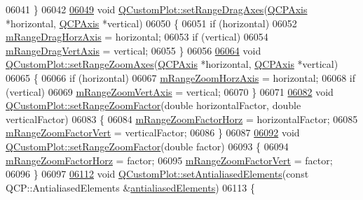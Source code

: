 \begin{DoxyCode}
06041 \}
06042 
\hypertarget{a00115_source_l06049}{}\hyperlink{a00116_a9fa10e826a174884391c1c839d52c0a3}{06049} \textcolor{keywordtype}{void} \hyperlink{a00116_a9fa10e826a174884391c1c839d52c0a3}{QCustomPlot::setRangeDragAxes}(\hyperlink{a00025}{QCPAxis} *horizontal, 
      \hyperlink{a00025}{QCPAxis} *vertical)
06050 \{
06051   \textcolor{keywordflow}{if} (horizontal)
06052     \hyperlink{a00116_ae73b7d61e9c0b25088f1cd805fc6f269}{mRangeDragHorzAxis} = horizontal;
06053   \textcolor{keywordflow}{if} (vertical)
06054     \hyperlink{a00116_a13364bbe1871cc2810ebd8946e30cc49}{mRangeDragVertAxis} = vertical;
06055 \}
06056 
\hypertarget{a00115_source_l06064}{}\hyperlink{a00116_a9808f1736b8116c116bcccb53cdb210a}{06064} \textcolor{keywordtype}{void} \hyperlink{a00116_a9808f1736b8116c116bcccb53cdb210a}{QCustomPlot::setRangeZoomAxes}(\hyperlink{a00025}{QCPAxis} *horizontal, 
      \hyperlink{a00025}{QCPAxis} *vertical)
06065 \{
06066   \textcolor{keywordflow}{if} (horizontal)
06067     \hyperlink{a00116_a3239b66fb24563a5dda0503a69a892d5}{mRangeZoomHorzAxis} = horizontal;
06068   \textcolor{keywordflow}{if} (vertical)
06069     \hyperlink{a00116_a16094e9a3c30151c3c820cd9d4894b84}{mRangeZoomVertAxis} = vertical;
06070 \}
06071 
\hypertarget{a00115_source_l06082}{}\hyperlink{a00116_ab0589ec79b1081b13ffb7cf5791a8735}{06082} \textcolor{keywordtype}{void} \hyperlink{a00116_ab0589ec79b1081b13ffb7cf5791a8735}{QCustomPlot::setRangeZoomFactor}(\textcolor{keywordtype}{double} horizontalFactor, \textcolor{keywordtype}{double} 
      verticalFactor)
06083 \{
06084   \hyperlink{a00116_a575195f0c4e9f7a766495da2ac41e0a6}{mRangeZoomFactorHorz} = horizontalFactor;
06085   \hyperlink{a00116_a133700b56f6b8e472f99058b43f5a0e9}{mRangeZoomFactorVert} = verticalFactor;
06086 \}
06087 
\hypertarget{a00115_source_l06092}{}\hyperlink{a00116_abc0e662d15d41f7262a440818c6885d1}{06092} \textcolor{keywordtype}{void} \hyperlink{a00116_ab0589ec79b1081b13ffb7cf5791a8735}{QCustomPlot::setRangeZoomFactor}(\textcolor{keywordtype}{double} factor)
06093 \{
06094   \hyperlink{a00116_a575195f0c4e9f7a766495da2ac41e0a6}{mRangeZoomFactorHorz} = factor;
06095   \hyperlink{a00116_a133700b56f6b8e472f99058b43f5a0e9}{mRangeZoomFactorVert} = factor;
06096 \}
06097 
\hypertarget{a00115_source_l06112}{}\hyperlink{a00116_af6f91e5eab1be85f67c556e98c3745e8}{06112} \textcolor{keywordtype}{void} \hyperlink{a00116_af6f91e5eab1be85f67c556e98c3745e8}{QCustomPlot::setAntialiasedElements}(\textcolor{keyword}{const} QCP::AntialiasedElements 
      &\hyperlink{a00116_acc24388098ddb95f5a651cede3f34b99}{antialiasedElements})
06113 \{

\end{DoxyCode}

